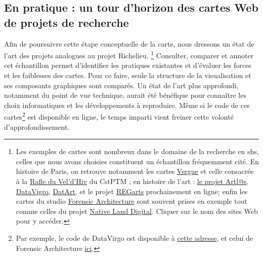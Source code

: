 \subsection{En pratique : un tour d'horizon des cartes Web de projets de recherche}
Afin de poursuivre cette étape conceptuelle de la carte, nous dressons un état de l'art des projets analogues au projet Richelieu. \footnote{Les exemples de cartes sont nombreux dans le domaine de la recherche en \acrshort{shs}, celles que nous avons choisies constituent un échantillon fréquemment cité. En histoire de Paris, on retrouve notamment les cartes \href{https://vergue.com/carto-vergue-paris/}{Vergue} et celle consacrée à la \href{https://fnp.huma-num.fr/aws/app/714c416a-fd4b-11ec-a932-a50d533ee08c/index.html?dummy=1658312704504}{Rafle du Vel'd'Hiv} du CstPTM ;  en histoire de l'art : \href{https://paris-art-market.huma-num.fr/}{le projet Artl@s}, \href{https://datavirgo.huma-num.fr/}{DataVigro}, \href{https://datart.huma-num.fr/}{DatArt}, et le projet \href{https://www.inha.fr/fr/recherche/programmation-scientifique/en-2023-2024/seminaire-regarts-trajectoires-plurielles-les-eleves-de-l-ecole-des-beaux-arts-de-paris-1800-1968.html}{REGarts} prochainement en ligne; enfin les cartes du studio \href{https://forensic-architecture.org/}{Forensic Architecture} sont souvent prises en exemple tout comme celles du projet \href{https://native-land.ca/?lang=fr}{Native Land Digital}. Cliquer sur le nom des sites Web pour y accéder.} Consulter, comparer et annoter cet échantillon permet d'identifier les pratiques existantes et d'évaluer les forces et les faiblesses des cartes. Pour ce faire, seule la structure de la visualisation et ses composants graphiques sont comparés. Un état de l'art plus approfondi, notamment du point de vue technique, aurait été bénéfique pour connaître les choix informatiques et les développements à reproduire. Même si le code de ces cartes\footnote{Par exemple, le code de DataVirgo est disponible à \href{https://github.com/QuentinEmilianoBernet/DataVirgo-interactive-mapping/blob/main/Datavirgo_source_code.js}{cette adresse}, et celui de Forensic Architecture \href{https://github.com/forensic-architecture/timemap}{ici}.} est disponible en ligne, le temps imparti vient freiner cette volonté d'approfondissement. 

